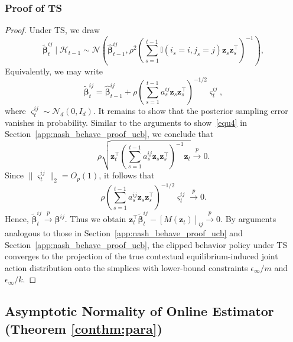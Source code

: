 \documentclass[12pt]{article}
\begin{document}
\subsubsection{Proof of TS}
\begin{proof}
Under TS, we draw
\[
\widetilde{\bm\beta}_{t}^{ij}
\mid \mathcal H_{t-1}
\sim
\mathcal N\left(
\widehat{\bm\beta}_{t-1}^{ij},
\rho^2 \left(\sum_{s=1}^{t-1} \mathbb I(i_s=i,j_s=j)\bm z_s\bm z_s^\top \right)^{-1}
\right),
\]
Equivalently, we may write
\[
\widetilde{\bm\beta}_{t}^{ij}
= \widehat{\bm\beta}_{t-1}^{ij} +
\rho
\left(\sum_{s=1}^{t-1} a_s^{ij}\bm z_s\bm z_s^\top\right)^{-1/2}\bm\varsigma_t^{ij},
\]
where $\bm\varsigma_t^{ij}\sim \mathcal N_d(0,I_d)$. It remains to show that the posterior sampling error vanishes in probability.
Similar to the arguments to show~\eqref{equ4} in Section~\ref{app:nash_behave_proof_ucb}, we conclude that
\begin{equation*}
\rho \sqrt{
\bm z_t^\top
\left(\sum_{s=1}^{t-1} a_{s}^{ij}\bm z_s\bm z_s^\top\right)^{-1}
\bm z_t } \stackrel{p}{\to} 0.    
\end{equation*}
Since $\|\bm\varsigma_t^{ij}\|_2=O_p(1)$,
it follows that
\[
\rho
\left(\sum_{s=1}^{t-1} a_{s}^{ij} \bm z_s\bm z_s^\top \right)^{-1/2}\bm\varsigma_t^{ij}
\stackrel{p}{\to}
0.
\]
Hence, $\widetilde{\bm\beta}_{t}^{ij} \stackrel{p}{\to} \bm\beta^{ij}$.
Thus we obtain $\bm z_t^\top \widetilde{\bm\beta}_{t}^{ij}-[M(\bm z_t)]_{ij} \stackrel{p}{\to} 0.$
By arguments analogous to those in Section~\ref{app:nash_behave_proof_ucb} and Section~\ref{app:nash_behave_proof_ucb}, the clipped behavior policy under TS converges to the projection of the true contextual equilibrium-induced joint action distribution onto the simplices with lower-bound constraints $\epsilon_\infty/m$ and $\epsilon_\infty/k$.
\end{proof}

\subsection{Asymptotic Normality of Online Estimator (Theorem \ref{conthm:para})}
\label{app:conthm:para_proof}
\end{document}
